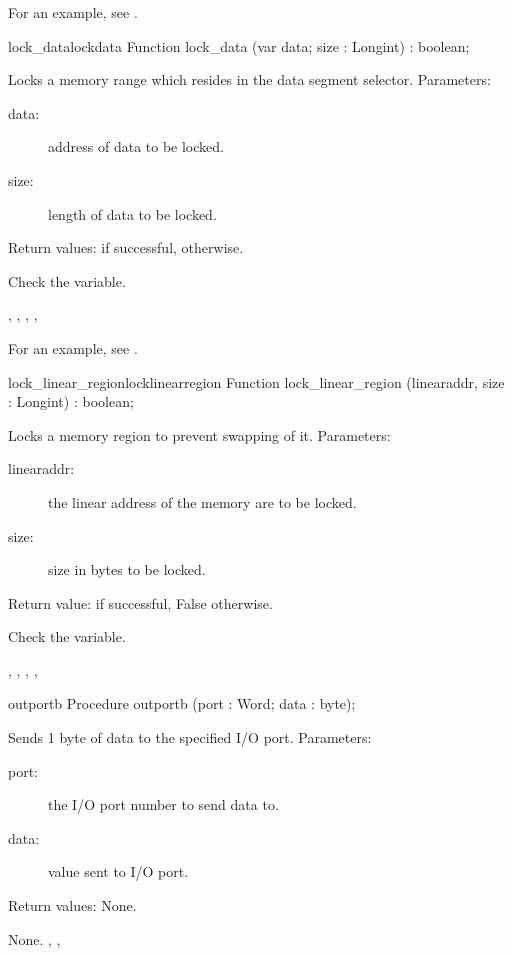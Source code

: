 For an example, see .
\begin{functionl}{lock\_data}{lockdata}
\Declaration
Function lock\_data (var data; size : Longint) : boolean;

\Description
Locks a memory range which resides in the data segment selector.
Parameters:
\begin{description}
\item[data:\ ] address of data to be locked.
\item[size:\ ] length of data to be locked.
\end{description}
Return values:  if successful,  otherwise.

\Errors
 Check the  variable.
\SeeAlso

,
,
,
,
\end{functionl}
For an example, see .
\begin{functionl}{lock\_linear\_region}{locklinearregion}
\Declaration
Function lock\_linear\_region (linearaddr, size : Longint) : boolean;

\Description
Locks a memory region to prevent swapping of it.
Parameters: 
\begin{description}
\item[linearaddr:\ ] the linear address of the memory are to be locked.
\item[size:\ ] size in bytes to be locked.
\end{description}
Return value:  if successful, False otherwise.

\Errors
 Check the  variable.
\SeeAlso

,
,
,
,
\end{functionl}
\begin{procedure}{outportb}
\Declaration
Procedure outportb (port : Word; data : byte);

\Description
Sends 1 byte of data to the specified I/O port.
Parameters: 
\begin{description}
\item[port:\ ] the I/O port number to send data to.
\item[data:\ ] value sent to I/O port.
\end{description}
Return values: None.

\Errors
 None. 
\SeeAlso
{}, ,  
\end{procedure}
